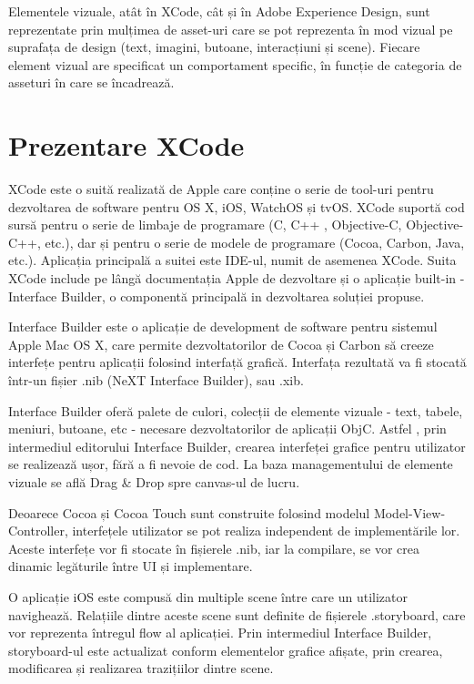 Elementele vizuale, atât în XCode, cât și în Adobe Experience Design, sunt reprezentate prin mulțimea de asset-uri care se pot reprezenta în mod vizual pe suprafața de design (text, imagini, butoane, interacțiuni și scene). Fiecare element vizual are specificat un comportament specific, în funcție de categoria de asseturi în care se încadrează.

\section{Prezentare XCode}

XCode este o suită realizată de Apple care conține o serie de tool-uri pentru dezvoltarea de software pentru OS X, iOS, WatchOS și tvOS. XCode suportă cod sursă pentru o serie de limbaje de programare (C, C++ , Objective-C, Objective-C++, etc.), dar și pentru o serie de modele de programare (Cocoa, Carbon, Java, etc.). Aplicația principală a suitei este IDE-ul, numit de asemenea XCode. Suita XCode include pe lângă documentația Apple de dezvoltare și o aplicație built-in - Interface Builder, o componentă principală in dezvoltarea soluției propuse.

Interface Builder este o aplicație de development de software pentru sistemul Apple Mac OS X, care permite dezvoltatorilor de Cocoa și Carbon să creeze interfețe pentru aplicații folosind interfață grafică. Interfața rezultată va fi stocată într-un fișier .nib (NeXT Interface Builder), sau .xib.

Interface Builder oferă palete de culori, colecții de elemente vizuale - text, tabele, meniuri, butoane, etc - necesare dezvoltatorilor de aplicații ObjC. Astfel , prin intermediul editorului Interface Builder, crearea interfeței grafice pentru utilizator se realizează ușor, fără a fi nevoie de cod. La baza managementului de elemente vizuale se află Drag & Drop spre canvas-ul de lucru. 

Deoarece Cocoa și Cocoa Touch sunt construite folosind modelul Model-View-Controller, interfețele utilizator se pot realiza independent de implementările lor. Aceste interfețe vor fi stocate în fișierele .nib, iar la compilare, se vor crea dinamic legăturile între UI și implementare.

O aplicație iOS este compusă din multiple scene între care un utilizator navighează. Relațiile dintre aceste scene sunt definite de fișierele .storyboard, care vor reprezenta întregul flow al aplicației. Prin intermediul Interface Builder, storyboard-ul este actualizat conform elementelor grafice afișate, prin crearea, modificarea și realizarea trazițiilor dintre scene.

